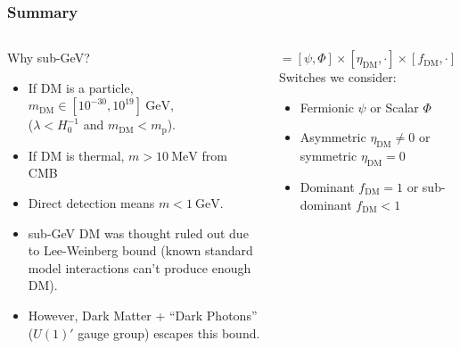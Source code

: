 \documentclass[aspectratio=169]{beamer}
\begin{document}
\begin{frame}
    \frametitle{Summary}

    \begin{columns}[t]
        \begin{block}{Why sub-GeV?}
            \begin{itemize}
                \item If DM is a particle, $m_\text{DM}\in[10^{-30},10^{19}]~\text{GeV}$, \\\hfill($\lambda<H_0^{-1}$ and $m_\text{DM} <m_\text{p}$).
                \item If DM is thermal, $m > 10~\text{MeV}$ from CMB
                \item Direct detection means $m<1~\text{GeV}$.
                \item sub-GeV DM was thought ruled out due to Lee-Weinberg bound (known standard model interactions can't produce enough DM).
                \item However, Dark Matter + ``Dark Photons'' ($U(1)'$ gauge group) escapes this bound.
            \end{itemize}
        \end{block}
        \begin{block}{$=[\psi,\Phi]\times[\eta_\text{DM},\cdot]\times[f_\text{DM},\cdot]$}
            Switches we consider:
            \begin{itemize}
                \item Fermionic $\psi$ or Scalar $\Phi$
                \item Asymmetric $\eta_\text{DM}\ne0$ or symmetric $\eta_\text{DM}=0$
                \item Dominant $f_\text{DM}=1$ or sub-dominant $f_\text{DM}<1$
            \end{itemize}
        \end{block}
    \end{columns}


\end{frame}
\end{document}
